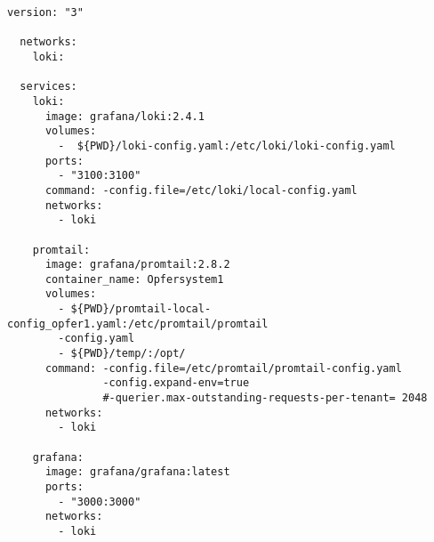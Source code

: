 {
\begin{Verbatim}[frame=single]
  version: "3"

  networks:
    loki:
  
  services:
    loki:
      image: grafana/loki:2.4.1
      volumes:
        -  ${PWD}/loki-config.yaml:/etc/loki/loki-config.yaml
      ports:
        - "3100:3100"
      command: -config.file=/etc/loki/local-config.yaml
      networks:
        - loki
  
    promtail:
      image: grafana/promtail:2.8.2
      container_name: Opfersystem1
      volumes:
        - ${PWD}/promtail-local-config_opfer1.yaml:/etc/promtail/promtail
        -config.yaml
        - ${PWD}/temp/:/opt/
      command: -config.file=/etc/promtail/promtail-config.yaml 
               -config.expand-env=true 
               #-querier.max-outstanding-requests-per-tenant= 2048
      networks:
        - loki
  
    grafana:
      image: grafana/grafana:latest
      ports:
        - "3000:3000"
      networks:
        - loki  
\end{Verbatim}
}
